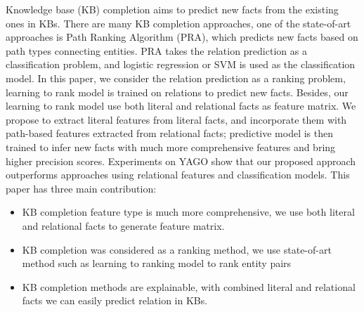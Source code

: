 \begin{eabstract}
Knowledge base (KB) completion aims to predict new facts
from the existing ones in KBs. There are many KB completion approaches,
one of the state-of-art approaches is Path Ranking Algorithm
(PRA), which predicts new facts based on path types connecting entities.
PRA takes the relation prediction as a classification problem, and
logistic regression or SVM is used as the classification model. In this paper, we
consider the relation prediction as a ranking problem, learning to rank
model is trained on relations to predict new facts. Besides, our learning to rank model
use both literal and relational facts as feature matrix.
We propose to extract literal features from
literal facts, and incorporate them with path-based
features extracted from relational facts; predictive
model is then trained to infer new
facts with much more comprehensive features and bring higher precision scores. Experiments on YAGO show that our proposed approach outperforms approaches using
relational features and classification models.
This paper has three main contribution:
\begin{itemize}[$\bullet$]
    \item KB completion feature type is much more comprehensive, we use both literal and relational facts to generate feature matrix.
    \item KB completion was considered as a ranking method, we use state-of-art method such as learning to ranking model to rank entity pairs
    \item KB completion methods are explainable, with combined literal and relational facts we can easily predict relation in KBs.
  \end{itemize}

\end{eabstract}


